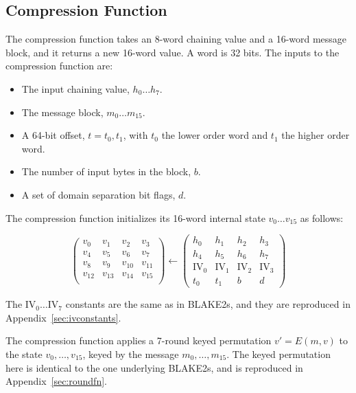 \documentclass[11pt,notitlepage,a4paper]{article}
\newcommand{\IV}{\text{IV}}
\begin{document}
\subsection{Compression Function}\label{sec:compression}

The compression function takes an 8-word chaining value and a 16-word message
block, and it returns a new 16-word value. A word is 32 bits. The inputs to
the compression function are:

\begin{itemize}
    \item The input chaining value, $h_{0} \ldots h_{7}$.
    \item The message block, $m_{0} \ldots m_{15}$.
    \item A 64-bit offset, $t=t_{0},t_{1}$, with $t_{0}$ the lower order word
        and $t_{1}$ the higher order word.
    \item The number of input bytes in the block, $b$.
    \item A set of domain separation bit flags, $d$.
\end{itemize}

The compression function initializes its 16-word internal state $v_{0} \ldots
v_{15}$ as follows: 

\begin{equation*}
\begin{pmatrix}
v_{0} & v_{1} & v_{2} & v_{3} \\
v_{4} & v_{5} & v_{6} & v_{7} \\
v_{8} & v_{9} & v_{10} & v_{11} \\
v_{12} & v_{13} & v_{14} & v_{15} \\
\end{pmatrix}
\leftarrow
\begin{pmatrix}
h_{0} & h_{1} & h_{2} & h_{3} \\
h_{4} & h_{5} & h_{6} & h_{7} \\
\IV_{0} & \IV_{1} & \IV_{2} & \IV_{3} \\
t_{0} & t_{1} & b & d 
\end{pmatrix}
\end{equation*}

The $\IV_{0} \ldots \IV_{7}$ constants are the same as in
BLAKE2s, and they are reproduced in Appendix~\ref{sec:ivconstants}.

The compression function applies a 7-round keyed permutation $v' = E(m, v)$ to
the state $v_0, \dots, v_{15}$, keyed by the message $m_0, \dots, m_{15}$. The
keyed permutation here is identical to the one underlying BLAKE2s, and is
reproduced in Appendix~\ref{sec:roundfn}.
\end{document}
